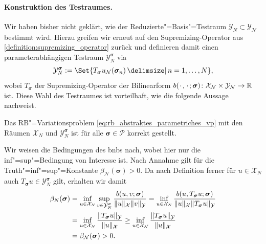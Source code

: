 \documentclass[../main.tex]{subfiles}
\begin{document}
\paragraph{Konstruktion des Testraumes.} %
\label{par:konstruktion_des_testraumes_}

Wir haben bisher nicht geklärt, wie der Reduzierte"=Basis"=Testraum $\mathcal Y_{N} \subset \mathcal Y_{\mathcal N}$ bestimmt wird.
Hierzu greifen wir erneut auf den Supremizing-Operator aus \cref{definition:supremizing_operator} zurück und definieren damit einen parameterabhängigen Testraum $\mathcal Y_{N}^{\bm \sigma}$ via
\begin{equation}
    \label{eq:rb_testraum_parameterabhaengig}
    \mathcal Y_{N}^{\bm \sigma} := \Set{ T_{\bm \sigma} u_{\mathcal N}(\bm \sigma_{n}) \given n = 1, \dots, N },
\end{equation}
wobei $T_{\bm \sigma}$ der Supremizing-Operator der Bilinearform $b({\mkern2mu\cdot\mkern2mu}, {\mkern2mu\cdot\mkern2mu}; \bm \sigma) \colon \mathcal X_{\mathcal N} \times \mathcal Y_{\mathcal N} \to \mathbb{R}$ ist.
Diese Wahl des Testraumes ist vorteilhaft, wie die folgende Aussage nachweist.

\begin{Satz}
\label{satz:rb_testraum_liefert_korrekt_gestelltes_problem}
    Das RB"=Variationsproblem \cref{eq:rb_abstraktes_parametriches_vp} mit den Räumen $\mathcal X_{N}$ und $\mathcal Y_{N}^{\bm \sigma}$ ist für alle $\bm \sigma \in \mathcal P$ korrekt gestellt.

    \begin{Beweis}
        Wir weisen die Bedingungen des \acl{bnb}s nach, wobei hier nur die inf"=sup"=Bedingung von Interesse ist.
        Nach Annahme gilt für die Truth"=inf"=sup"=Konstante $\beta_{\mathcal N}(\bm \sigma) > 0$.
        Da nach Definition ferner für $u \in \mathcal X_{N}$ auch $T_{\bm \sigma}u \in \mathcal Y_{N}^{\bm \sigma}$ gilt, erhalten wir damit
        \begin{equation}
            \begin{aligned}
                \beta_{N}(\bm \sigma)
                &= \inf_{u \in \mathcal X_{N}} \sup_{v \in \mathcal Y_{N}^{\bm \sigma}} \frac{b(u, v; \bm \sigma)}{\lVert u\rVert_{\mathcal X} \lVert v\rVert_{\mathcal Y}}
                = \inf_{u \in \mathcal X_{N}} \frac{b(u, T_{\bm \sigma}u; \bm \sigma)}{\lVert u\rVert_{\mathcal X} \lVert T_{\bm \sigma} u\rVert_{\mathcal Y}}
                \\&= \inf_{u \in \mathcal X_{N}} \frac{\lVert T_{\bm \sigma}u\rVert_{\mathcal Y}}{\lVert u\rVert_{\mathcal X}}
                \geq \inf_{u \in \mathcal X_{\mathcal N}} \frac{\lVert T_{\bm \sigma}u\rVert_{\mathcal Y}}{\lVert u\rVert_{\mathcal X}}
                \\&= \beta_{\mathcal N}(\bm \sigma) > 0.
            \end{aligned}
        \end{equation}
    \end{Beweis}
\end{Satz}
\end{document}
